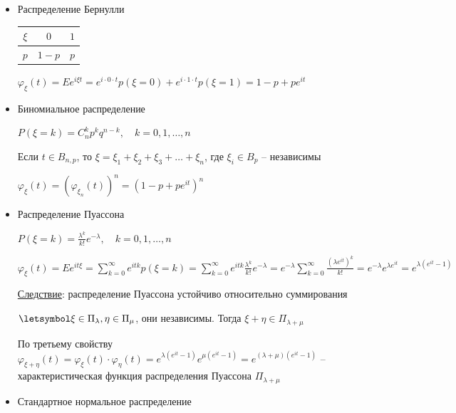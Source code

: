 \begin{itemize}
    \item Распределение Бернулли

    \smallvspace

    \begin{tabular}{c|c|c}
        $\xi$ & $0$     & $1$    \\
        \hline
        $p$   & $1 - p$ & $p$
    \end{tabular}

    \smallvspace

    $\varphi_\xi(t) = Ee^{i\xi t} = e^{i \cdot 0 \cdot t} p(\xi = 0) + e^{i \cdot 1 \cdot t} p(\xi = 1) = 1 - p + p e^{it}$

    \item Биномиальное распределение

    $P(\xi = k) = C_n^k p^k q^{n - k}, \quad k = 0, 1, \dots, n$

    Если $t \in B_{n,p}$, то $\xi = \xi_1 + \xi_2 + \xi_3 + \dots + \xi_n$, где $\xi_i \in B_p$ -- независимы

    $\varphi_\xi(t) = (\varphi_{\xi_n}(t))^n = (1 - p + p e^{it})^n$

    \item Распределение Пуассона

    $P(\xi = k) = \frac{\lambda^k}{k!} e^{-\lambda}, \quad k = 0, 1, \dots, n$

    $\varphi_\xi(t) = Ee^{it\xi} = \sum_{k = 0}^\infty e^{itk} p(\xi = k) = \sum_{k = 0}^\infty e^{itk} \frac{\lambda^k}{k!} e^{-\lambda} = 
    e^{-\lambda} \sum_{k = 0}^\infty \frac{(\lambda e^{it})^k}{k!} = e^{-\lambda} e^{\lambda e^{it}} = e^{\lambda (e^{it} - 1)}$

    \underline{Следствие}: распределение Пуассона устойчиво относительно суммирования

    \begin{MyTheorem}
        $\letsymbol \xi \in \Pi_\lambda, \eta \in \Pi_\mu$, они независимы. Тогда $\xi + \eta \in \Pi_{\lambda + \mu}$
    \end{MyTheorem}

    \begin{MyProof}
        По третьему свойству $\varphi_{\xi + \eta}(t) = \varphi_\xi(t) \cdot \varphi_\eta(t) = e^{\lambda(e^{it} - 1)} e^{\mu(e^{it} - 1)} = e^{(\lambda + \mu)(e^{it} - 1)}$ -- характеристическая функция распределения Пуассона $\Pi_{\lambda + \mu}$
    \end{MyProof}

    \item Стандартное нормальное распределение


\end{itemize}
